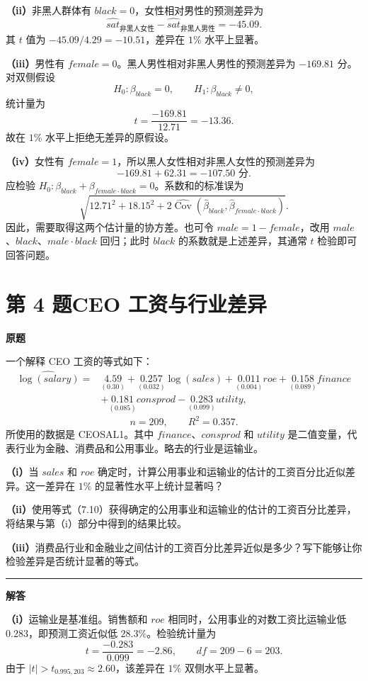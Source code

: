 \documentclass[UTF8,a4paper,11pt,fontset=fandol]{ctexart}
\newcommand{\vr}[1]{\mathit{#1}}
\newcommand{\Cov}{\operatorname{Cov}}
\newcommand{\subq}[1]{\par\medskip\noindent\textbf{（#1）}\enspace}
\newcommand{\question}[2]{\def\currentquestiontitle{第 #1 题\quad #2}}
\newcommand{\coef}[2]{\underset{\scriptstyle(#2)}{#1}}
\newenvironment{originalquestion}{%
  \par\medskip\noindent\begin{minipage}{\linewidth}
  \section*{\currentquestiontitle}
  \par\smallskip\noindent\textbf{原题}\par\smallskip
  \begingroup\small\setlength{\parskip}{2.5pt}%
}{%
  \par\endgroup\end{minipage}\par\medskip\Needspace{6\baselineskip}
  \noindent\rule{\linewidth}{0.35pt}\par\smallskip
  \noindent\textbf{解答}\par
}
\begin{document}
\subq{ii}非黑人群体有 $\vr{black}=0$，女性相对男性的预测差异为
\[
\widehat{\vr{sat}}_{\text{非黑人女性}}
-\widehat{\vr{sat}}_{\text{非黑人男性}}=-45.09.
\]
其 $t$ 值为 $-45.09/4.29=-10.51$，差异在 $1\%$ 水平上显著。

\subq{iii}男性有 $\vr{female}=0$。黑人男性相对非黑人男性的预测差异为 $-169.81$ 分。对双侧假设
\[
H_0:\beta_{\vr{black}}=0,\qquad H_1:\beta_{\vr{black}}\ne0,
\]
统计量为
\[
t=\frac{-169.81}{12.71}=-13.36.
\]
故在 $1\%$ 水平上拒绝无差异的原假设。

\subq{iv}女性有 $\vr{female}=1$，所以黑人女性相对非黑人女性的预测差异为
\[
-169.81+62.31=\boxed{-107.50\text{ 分}}.
\]
应检验 $H_0:\beta_{\vr{black}}+\beta_{\vr{female}\cdot\vr{black}}=0$。系数和的标准误为
\[
\sqrt{12.71^2+18.15^2+
2\widehat{\Cov}\!\left(
\widehat\beta_{\vr{black}},
\widehat\beta_{\vr{female}\cdot\vr{black}}\right)}.
\]
因此，需要取得这两个估计量的协方差。也可令 $\vr{male}=1-\vr{female}$，改用 $\vr{male}$、$\vr{black}$、$\vr{male}\cdot\vr{black}$ 回归；此时 $\vr{black}$ 的系数就是上述差异，其通常 $t$ 检验即可回答问题。

\question{4}{CEO 工资与行业差异}
\begin{originalquestion}
一个解释 CEO 工资的等式如下：
\[
\begin{aligned}
\widehat{\log(\vr{salary})}={}&\coef{4.59}{0.30}
+\coef{0.257}{0.032}\log(\vr{sales})
+\coef{0.011}{0.004}\vr{roe}
+\coef{0.158}{0.089}\vr{finance}\\
&+\coef{0.181}{0.085}\vr{consprod}
-\coef{0.283}{0.099}\vr{utility},
\end{aligned}
\]
\[
n=209,\qquad R^2=0.357.
\]
所使用的数据是 CEOSAL1。其中 $\vr{finance}$、$\vr{consprod}$ 和 $\vr{utility}$ 是二值变量，代表行业为金融、消费品和公用事业。略去的行业是运输业。

\subq{i}当 $\vr{sales}$ 和 $\vr{roe}$ 确定时，计算公用事业和运输业的估计的工资百分比近似差异。这一差异在 $1\%$ 的显著性水平上统计显著吗？

\subq{ii}使用等式（7.10）获得确定的公用事业和运输业的估计的工资百分比差异，将结果与第（i）部分中得到的结果比较。

\subq{iii}消费品行业和金融业之间估计的工资百分比差异近似是多少？写下能够让你检验差异是否统计显著的等式。
\end{originalquestion}

\subq{i}运输业是基准组。销售额和 $\vr{roe}$ 相同时，公用事业的对数工资比运输业低 $0.283$，即预测工资近似低 $28.3\%$。检验统计量为
\[
t=\frac{-0.283}{0.099}=-2.86,\qquad df=209-6=203.
\]
由于 $|t|>t_{0.995,203}\approx2.60$，该差异在 $1\%$ 双侧水平上显著。
\end{document}
